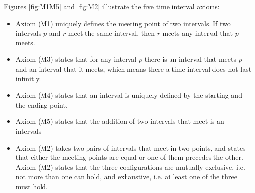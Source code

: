 \documentclass{llncs}
\begin{document}
Figures \ref{fig:M1M5} and \ref{fig:M2} illustrate the five time interval axioms:
\begin{itemize}
\item Axiom (M1) uniquely defines the meeting point of two intervals. If two intervals $p$ and $r$ meet the same interval, then $r$ meets any interval that $p$ meets. %
\item Axiom (M3) states that for any interval $p$ there is an interval that meets $p$ and an interval that it meets, which means there a time interval does not last infinitly.
\item Axiom (M4) states that an interval is uniquely defined by the starting and the ending point. 
\item Axiom (M5) states that the addition of two intervals that meet is an intervals. %
\item Axiom (M2) takes two pairs of intervals that meet in two points, and states that  either the meeting points are equal or one of them precedes the other.  Axiom (M2) states that the three configurations are mutually exclusive, i.e. not more than one can hold, and exhaustive, i.e. at least one of the three must hold.
\end{itemize}
\end{document}

